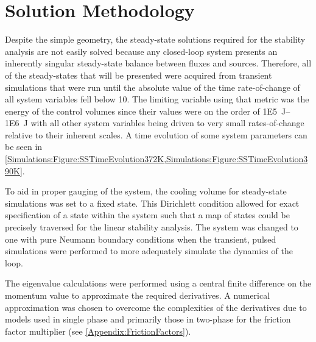 \section{Solution Methodology}

Despite the simple geometry, the steady-state solutions required for the stability analysis are not easily solved because any closed-loop system presents an inherently singular steady-state balance between fluxes and sources.
Therefore, all of the steady-states that will be presented were acquired from transient simulations that were run until the absolute value of the time rate-of-change of all system variables fell below 10.
The limiting variable using that metric was the energy of the control volumes since their values were on the order of \SIrange{1E5}{1E6}{\joule} with all other system variables being driven to very small rates-of-change relative to their inherent scales.
A time evolution of some system parameters can be seen in \cref{Simulations:Figure:SSTimeEvolution372K,Simulations:Figure:SSTimeEvolution390K}.

To aid in proper gauging of the system, the cooling volume for steady-state simulations was set to a fixed state.
This Dirichlett condition allowed for exact specification of a state within the system such that a map of states could be precisely traversed for the linear stability analysis.
The system was changed to one with pure Neumann boundary conditions when the transient, pulsed simulations were performed to more adequately simulate the dynamics of the loop.

The eigenvalue calculations were performed using a central finite difference on the momentum value to approximate the required derivatives.
A numerical approximation was chosen to overcome the complexities of the derivatives due to models used in single phase and primarily those in two-phase for the friction factor multiplier (see \cref{Appendix:FrictionFactors}).


